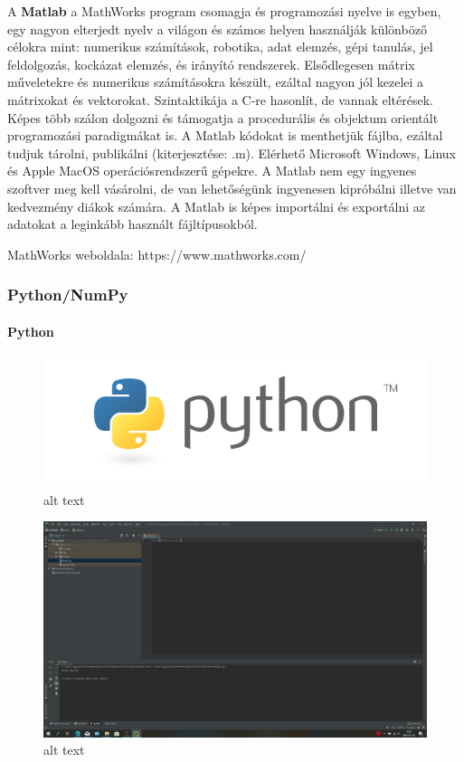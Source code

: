 A \textbf{Matlab} a MathWorks program csomagja és programozási nyelve is
egyben, egy nagyon elterjedt nyelv a világon és számos helyen használják
különböző célokra mint: numerikus számítások, robotika, adat elemzés,
gépi tanulás, jel feldolgozás, kockázat elemzés, és irányító rendszerek.
Elsődlegesen mátrix műveletekre és numerikus számításokra készült,
ezáltal nagyon jól kezelei a mátrixokat és vektorokat. Szintaktikája a
C-re hasonlít, de vannak eltérések. Képes több szálon dolgozni és
támogatja a procedurális és objektum orientált programozási paradigmákat
is. A Matlab kódokat is menthetjük fájlba, ezáltal tudjuk tárolni,
publikálni (kiterjesztése: .m). Elérhető Microsoft Windows, Linux és
Apple MacOS operációsrendszerű gépekre. A Matlab nem egy ingyenes
szoftver meg kell vásárolni, de van lehetőségünk ingyenesen kipróbálni
illetve van kedvezmény diákok számára. A Matlab is képes importálni és
exportálni az adatokat a leginkább használt fájltípusokból.

MathWorks weboldala: https://www.mathworks.com/

    \subsubsection{Python/NumPy}\label{pythonnumpy}

    \paragraph{Python}\label{python}

\begin{figure}
\centering
\includegraphics{img/python-logo.png}
\caption{alt text}
\end{figure}

\begin{figure}
\centering
\includegraphics{img/Python_screenshot.png}
\caption{alt text}
\end{figure}

